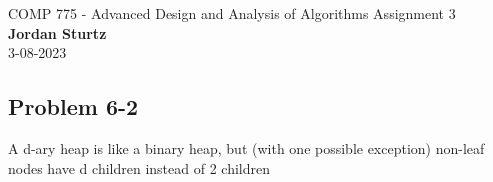 \documentclass[]{book}
\theoremstyle{definition}
\begin{document}
\begin{center}
{\Large COMP 775 - Advanced Design and Analysis of Algorithms \hspace{0.5cm} Assignment 3}\\
\textbf{Jordan Sturtz}\\ %
3-08-2023 %
\end{center}

\vspace{0.2 cm}

\subsection*{Problem 6-2}
A d-ary heap is like a binary heap, but (with one possible exception) non-leaf nodes have d children 
instead of 2 children
\end{document}
